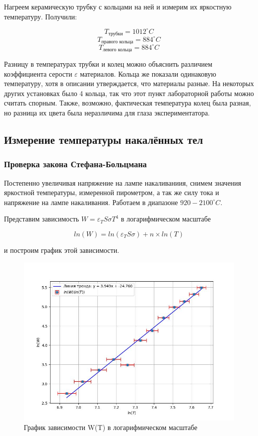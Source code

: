 \documentclass[a4paper,12pt]{article} %
\begin{document}
Нагреем керамическую трубку с кольцами на ней и измерим их яркостную температуру. Получили:

\[ T_{\text{трубки}} = 1012 ^\circ C\]
\[ T_{\text{правого кольца}} = 884 ^\circ C\]
\[ T_{\text{левого кольца}} = 884 ^\circ C\]

Разницу в температурах трубки и колец можно объяснить различием коэффициента серости $\varepsilon$ материалов. Кольца же показали одинаковую температуру, хотя в описании утверждается, что материалы разные. На некоторых других установках было 4 кольца, так что этот пункт лабораторной работы можно считать спорным. Также, возможно, фактическая температура колец была разная, но разница их цвета была неразличима для глаза экспериментатора.

\subsection * {Измерение температуры накалённых тел}

\subsubsection * {Проверка закона Стефана-Больцмана}

Постепенно увеличивая напряжение на лампе накаливаниия, снимем значения яркостной температуры, измеренной пирометром, а так же силу тока и напряжение на лампе накаливания. Работаем в диапазоне $920-2100 ^\circ C$. \par

Представим зависимость $W = \varepsilon_T S \sigma T^4$ в логарифмическом масштабе

\[ ln(W) = ln(\varepsilon_T S \sigma) + n \times ln(T) \]

и построим график этой зависимости.

\begin{figure}
    \centering
    \includegraphics[width=1\linewidth]{plot.jpg}
    \caption{График зависимости W(T) в логарифмическом масштабе}
    \label{fig:plt}
\end{figure}
\end{document}
